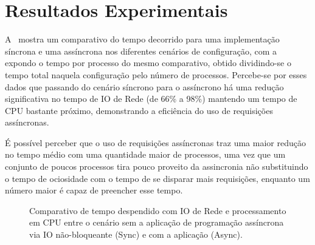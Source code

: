 \section{Resultados Experimentais}

A~ mostra um comparativo do tempo decorrido para
uma implementação síncrona e uma assíncrona nos diferentes cenários de
configuração, com a~ expondo o tempo por
processo do mesmo comparativo, obtido dividindo-se o tempo total naquela
configuração pelo número de processos. Percebe-se por esses dados que passando
do cenário síncrono para o assíncrono há uma redução significativa no tempo de
IO de Rede (de 66\% a 98\%) mantendo um tempo de CPU bastante próximo,
demonstrando a eficiência do uso de requisições assíncronas.

É possível perceber que o uso de requisições assíncronas traz uma maior redução
no tempo médio com uma quantidade maior de processos, uma vez que um conjunto
de poucos processos tira pouco proveito da assincronia não substituindo o tempo
de ociosidade com o tempo de se disparar mais requisições, enquanto um número
maior é capaz de preencher esse tempo.

\begin{figure}[htb]
    \centering
    \caption{%
      Comparativo de tempo despendido com IO de Rede e processamento em CPU
      entre o cenário sem a aplicação de programação assíncrona via IO
      não-bloqueante (Sync) e com a aplicação (Async).
    }
    \label{gra:tempos-async-vs-sync}
\end{figure}

